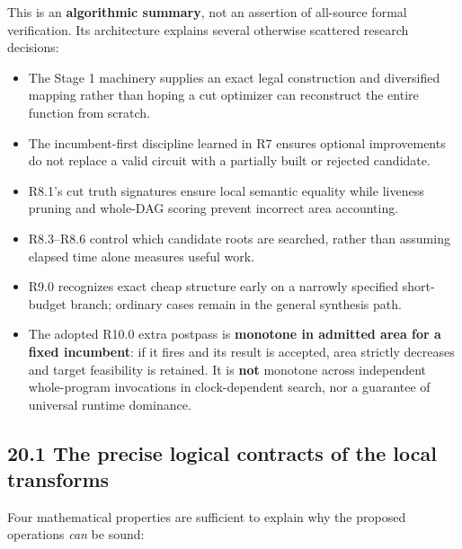 \documentclass[a4paper,10pt]{article}
\providecommand{\tightlist}{\setlength{\itemsep}{0pt}\setlength{\parskip}{0pt}}
\theoremstyle{definition}
\theoremstyle{remark}
\begin{document}
This is an \textbf{algorithmic summary}, not an assertion of all-source formal verification. Its architecture explains several otherwise scattered research decisions:

\begin{itemize}
\tightlist
\item
  The Stage 1 machinery supplies an exact legal construction and diversified mapping rather than hoping a cut optimizer can reconstruct the entire function from scratch.
\item
  The incumbent-first discipline learned in R7 ensures optional improvements do not replace a valid circuit with a partially built or rejected candidate.
\item
  R8.1's cut truth signatures ensure local semantic equality while liveness pruning and whole-DAG scoring prevent incorrect area accounting.
\item
  R8.3--R8.6 control which candidate roots are searched, rather than assuming elapsed time alone measures useful work.
\item
  R9.0 recognizes exact cheap structure early on a narrowly specified short-budget branch; ordinary cases remain in the general synthesis path.
\item
  The adopted R10.0 extra postpass is \textbf{monotone in admitted area for a fixed incumbent}: if it fires and its result is accepted, area strictly decreases and target feasibility is retained. It is \textbf{not} monotone across independent whole-program invocations in clock-dependent search, nor a guarantee of universal runtime dominance.
\end{itemize}

\subsection{20.1 The precise logical contracts of the local transforms}\label{the-precise-logical-contracts-of-the-local-transforms}

Four mathematical properties are sufficient to explain why the proposed operations \emph{can} be sound:
\end{document}
